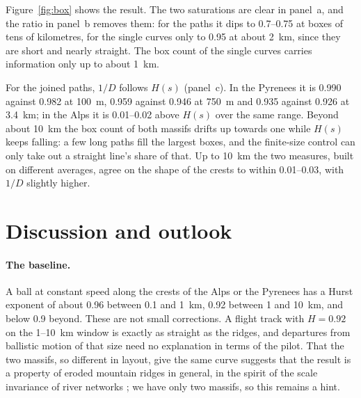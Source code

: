 \documentclass[11pt,a4paper]{article}
\begin{document}
Figure~\ref{fig:box} shows the result. The two saturations are clear in
panel~a, and the ratio in panel~b removes them: for the paths it dips to
0.7--0.75 at boxes of tens of kilometres, for the single curves only to 0.95
at about 2~km, since they are short and nearly straight. The box count of the
single curves carries information only up to about 1~km.

For the joined paths, $1/D$ follows $H(s)$ (panel~c). In the Pyrenees it is
0.990 against 0.982 at 100~m, 0.959 against 0.946 at 750~m and 0.935 against
0.926 at 3.4~km; in the Alps it is 0.01--0.02 above $H(s)$ over the same
range. Beyond about 10~km the box count of both massifs drifts up towards one
while $H(s)$ keeps falling: a few long paths fill the largest boxes, and the
finite-size control can only take out a straight line's share of that. Up to
10~km the two measures, built on different averages, agree on the shape of
the crests to within 0.01--0.03, with $1/D$ slightly higher.

\section{Discussion and outlook}
\label{sec:discussion}

\paragraph{The baseline.}
A ball at constant speed along the crests of the Alps or the Pyrenees has a
Hurst exponent of about 0.96 between 0.1 and 1~km, 0.92 between 1 and 10~km,
and below 0.9 beyond. These are not small corrections. A flight track with
$H = 0.92$ on the 1--10~km window is exactly as straight as the ridges, and
departures from ballistic motion of that size need no explanation in terms of
the pilot. That the two massifs, so different in layout, give the same curve
suggests that the result is a property of eroded mountain ridges in general,
in the spirit of the scale invariance of river networks
\citep{rodriguez1997}; we have only two massifs, so this remains a hint.
\end{document}
